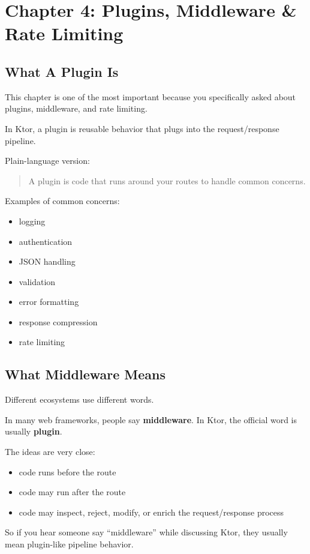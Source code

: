\documentclass[11pt,a4paper]{article}
\begin{document}
\section{Chapter 4: Plugins, Middleware \& Rate Limiting}

\subsection{What A Plugin Is}

This chapter is one of the most important because you specifically asked about plugins, middleware, and rate limiting.

In Ktor, a plugin is reusable behavior that plugs into the request/response pipeline.

Plain-language version:
\begin{quote}
A plugin is code that runs around your routes to handle common concerns.
\end{quote}

Examples of common concerns:
\begin{itemize}
    \item logging
    \item authentication
    \item JSON handling
    \item validation
    \item error formatting
    \item response compression
    \item rate limiting
\end{itemize}

\subsection{What Middleware Means}

Different ecosystems use different words.

In many web frameworks, people say \textbf{middleware}.
In Ktor, the official word is usually \textbf{plugin}.

The ideas are very close:
\begin{itemize}
    \item code runs before the route
    \item code may run after the route
    \item code may inspect, reject, modify, or enrich the request/response process
\end{itemize}

So if you hear someone say ``middleware'' while discussing Ktor, they usually mean plugin-like pipeline behavior.
\end{document}
